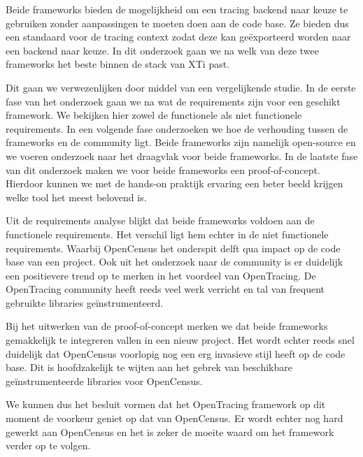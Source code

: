 Beide frameworks bieden de mogelijkheid om een tracing backend naar keuze te gebruiken zonder aanpassingen te moeten doen aan de code base. Ze bieden dus een standaard voor de tracing context zodat deze kan geëxporteerd worden naar een backend naar keuze. In dit onderzoek gaan we na welk van deze twee frameworks het beste binnen de stack van XTi past.

Dit gaan we verwezenlijken door middel van een vergelijkende studie. In de eerste fase van het onderzoek gaan we na wat de requirements zijn voor een geschikt framework. We bekijken hier zowel de functionele als niet functionele requirements. In een volgende fase onderzoeken we hoe de verhouding tussen de frameworks en de community ligt. Beide frameworks zijn namelijk open-source en we voeren onderzoek naar het draagvlak voor beide frameworks. In de laatste fase van dit onderzoek maken we voor beide frameworks een proof-of-concept. Hierdoor kunnen we met de hands-on praktijk ervaring een beter beeld krijgen welke tool het meest belovend is.

Uit de requirements analyse blijkt dat beide frameworks voldoen aan de functionele requirements. Het verschil ligt hem echter in de niet functionele requirements. Waarbij OpenCensus het onderspit delft qua impact op de code base van een project. Ook uit het onderzoek naar de community is er duidelijk een positievere trend op te merken in het voordeel van OpenTracing. De OpenTracing community heeft reeds veel werk verricht en tal van frequent gebruikte libraries geïnstrumenteerd.

Bij het uitwerken van de proof-of-concept merken we dat beide frameworks gemakkelijk te integreren vallen in een nieuw project. Het wordt echter reeds snel duidelijk dat OpenCensus voorlopig nog een erg invasieve stijl heeft op de code base. Dit is hoofdzakelijk te wijten aan het gebrek van beschikbare geïnstrumenteerde libraries voor OpenCensus.

We kunnen dus het besluit vormen dat het OpenTracing framework op dit moment de voorkeur geniet op dat van OpenCensus. Er wordt echter nog hard gewerkt aan OpenCensus en het is zeker de moeite waard om het framework verder op te volgen.